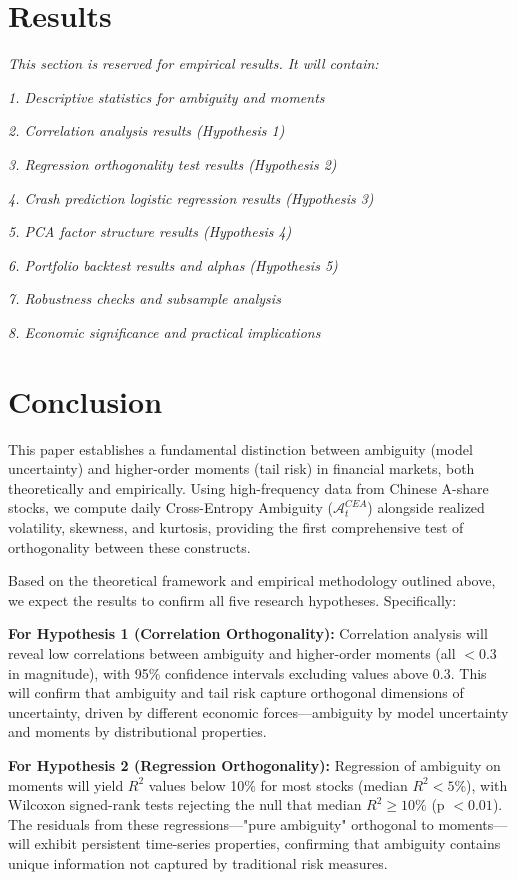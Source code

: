 \documentclass[preprint,12pt,authoryear]{elsarticle}
\begin{document}
\section{Results}

\textit{This section is reserved for empirical results. It will contain:}

\textit{1. Descriptive statistics for ambiguity and moments}

\textit{2. Correlation analysis results (Hypothesis 1)}

\textit{3. Regression orthogonality test results (Hypothesis 2)}

\textit{4. Crash prediction logistic regression results (Hypothesis 3)}

\textit{5. PCA factor structure results (Hypothesis 4)}

\textit{6. Portfolio backtest results and alphas (Hypothesis 5)}

\textit{7. Robustness checks and subsample analysis}

\textit{8. Economic significance and practical implications}

\section{Conclusion}

This paper establishes a fundamental distinction between ambiguity (model uncertainty) and higher-order moments (tail risk) in financial markets, both theoretically and empirically. Using high-frequency data from Chinese A-share stocks, we compute daily Cross-Entropy Ambiguity ($\mathcal{A}^{CEA}_t$) alongside realized volatility, skewness, and kurtosis, providing the first comprehensive test of orthogonality between these constructs.

Based on the theoretical framework and empirical methodology outlined above, we expect the results to confirm all five research hypotheses. Specifically:

\textbf{For Hypothesis 1 (Correlation Orthogonality):} Correlation analysis will reveal low correlations between ambiguity and higher-order moments (all $<0.3$ in magnitude), with 95\% confidence intervals excluding values above 0.3. This will confirm that ambiguity and tail risk capture orthogonal dimensions of uncertainty, driven by different economic forces—ambiguity by model uncertainty and moments by distributional properties.

\textbf{For Hypothesis 2 (Regression Orthogonality):} Regression of ambiguity on moments will yield $R^2$ values below 10\% for most stocks (median $R^2 < 5\%$), with Wilcoxon signed-rank tests rejecting the null that median $R^2 \geq 10\%$ (p $< 0.01$). The residuals from these regressions—"pure ambiguity" orthogonal to moments—will exhibit persistent time-series properties, confirming that ambiguity contains unique information not captured by traditional risk measures.
\end{document}

